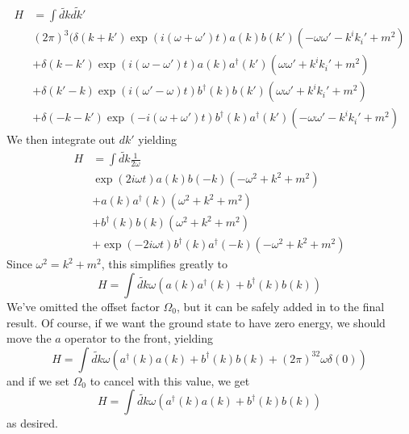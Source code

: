 \documentclass[fontsize=11pt]{scrartcl} %
\numberwithin{equation}{section} %
\numberwithin{figure}{section} %
\numberwithin{table}{section} %
\begin{document}
\[
    \begin{aligned}
        H &=
        \int \tilde{dk}\tilde{dk'}\\
        &(2\pi)^3(\delta(k+k')\exp(i(\omega + \omega')t)a(k)b(k')\left( 
            -\omega\omega' - k^ik_i' + m^2
            \right)\\
            &+\delta(k-k')\exp(i(\omega-\omega')t)a(k)a^{\dagger}(k')\left( 
                \omega\omega' + k^ik_i' + m^2
            \right)\\
            &+\delta(k'-k)\exp(i(\omega'-\omega)t)b^{\dagger}(k)b(k')\left( 
                \omega\omega' + k^ik_i' + m^2
            \right)\\
            &+\delta(-k-k')\exp(-i(\omega +
            \omega')t)b^{\dagger}(k)a^{\dagger}(k')\left( 
                -\omega\omega' - k^ik_i' + m^2
            \right)
    \end{aligned}
\]
We then integrate out $dk'$ yielding
\[
\begin{aligned}
    H &= \int \tilde{dk}\frac{1}{2\omega}\\
    &\exp(2i\omega t)a(k)b(-k)\left( 
        -\omega^2 + k^2 + m^2
    \right)\\
    &+a(k)a^{\dagger}(k)\left( 
        \omega^2 + k^2 + m^2
    \right)\\
    &+b^{\dagger}(k)b(k)\left( 
        \omega^2 + k^2 + m^2
    \right)\\
    &+\exp(-2i\omega t)b^{\dagger}(k)a^{\dagger}(-k)\left( 
    -\omega^2 + k^2 + m^2
    \right)
\end{aligned}
\]
Since $\omega^2 = k^2 + m^2$, this simplifies greatly to
\[
    H = \int \tilde{dk}\omega\left( a(k)a^{\dagger}(k) + b^{\dagger}(k)b(k) \right)
\]
We've omitted the offset factor $\Omega_0$, but it can be safely added in to the
final result. Of course, if we want the ground state to have zero energy, we
should move the $a$ operator to the front, yielding
\[
    H = \int \tilde{dk}\omega\left( a^{\dagger}(k)a(k) + b^{\dagger}(k)b(k) +
    (2\pi)^32\omega \delta(0) \right)
\]
and if we set $\Omega_0$ to cancel with this value, we get
\[
    H = \int \tilde{dk}\omega\left( a^{\dagger}(k)a(k) + b^{\dagger}(k)b(k)
    \right)
\]
as desired.
\end{document}

